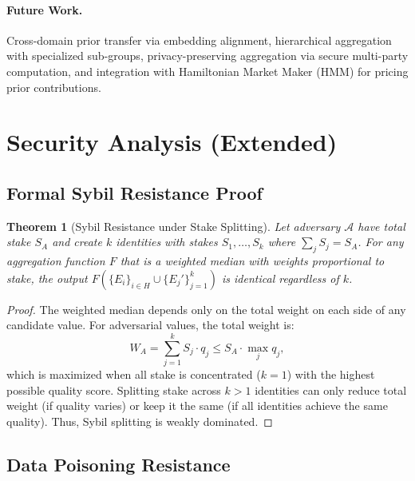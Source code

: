 \documentclass[11pt]{article}
\newtheorem{theorem}{Theorem}
\begin{document}
\paragraph{Future Work.}
Cross-domain prior transfer via embedding alignment, hierarchical aggregation
with specialized sub-groups, privacy-preserving aggregation via secure
multi-party computation, and integration with Hamiltonian Market Maker (HMM) for
pricing prior contributions.

\appendix

\section{Security Analysis (Extended)}
\label{app:security}

\subsection{Formal Sybil Resistance Proof}

\begin{theorem}[Sybil Resistance under Stake Splitting]
Let adversary $\mathcal{A}$ have total stake $S_A$ and create $k$ identities
with stakes $S_1, \ldots, S_k$ where $\sum_j S_j = S_A$. For any aggregation
function $F$ that is a weighted median with weights proportional to stake, the
output $F(\{E_i\}_{i \in H} \cup \{E_j'\}_{j=1}^k)$ is identical regardless
of $k$.
\end{theorem}

\begin{proof}
The weighted median depends only on the total weight on each side of any
candidate value. For adversarial values, the total weight is:
\begin{equation}
    W_A = \sum_{j=1}^k S_j \cdot q_j \leq S_A \cdot \max_j q_j,
\end{equation}
which is maximized when all stake is concentrated ($k = 1$) with the highest
possible quality score. Splitting stake across $k > 1$ identities can only
reduce total weight (if quality varies) or keep it the same (if all identities
achieve the same quality). Thus, Sybil splitting is weakly dominated.
\end{proof}

\subsection{Data Poisoning Resistance}
\end{document}
